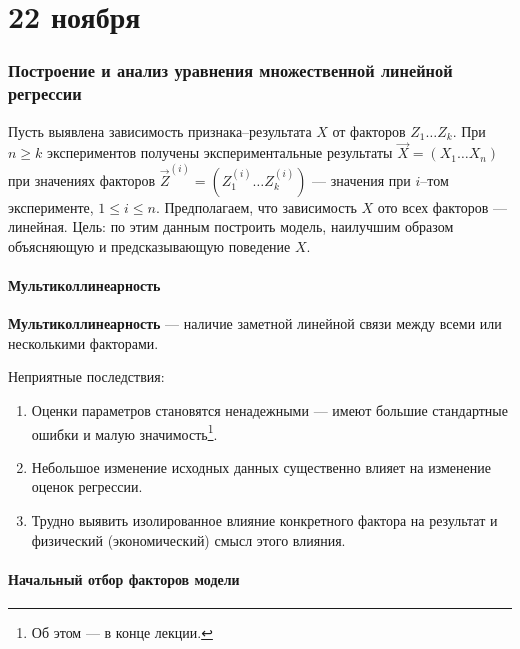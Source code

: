 \chapter{22 ноября}

\subsection{Построение и анализ уравнения множественной линейной регрессии}

Пусть выявлена зависимость признака--результата \(X\) от факторов \(Z_1 \dots Z_k\). При \(n \geq k\) экспериментов получены экспериментальные результаты \(\vec{X} = (X_1 \dots X_n)\) при значениях факторов \(\vec{Z}^{(i)} = (Z_1^{(i)} \dots Z_k^{(i)})\) --- значения при \(i\)--том эксперименте, \(1 \leq i \leq n\). Предполагаем, что зависимость \(X\) ото всех факторов --- линейная. Цель: по этим данным построить модель, наилучшим образом объясняющую и предсказывающую поведение \(X\).

\subsubsection{Мультиколлинеарность}

\begin{definition}
    \textbf{Мультиколлинеарность} --- наличие заметной линейной связи между всеми или несколькими факторами.
\end{definition}


Неприятные последствия:
\begin{enumerate}
    \item Оценки параметров становятся ненадежными --- имеют большие стандартные ошибки и малую значимость\footnote{Об этом --- в конце лекции.}.
    \item Небольшое изменение исходных данных существенно влияет на изменение оценок регрессии.
    \item Трудно выявить изолированное влияние конкретного фактора на результат и физический (экономический) смысл этого влияния.
\end{enumerate}

\subsubsection{Начальный отбор факторов модели}


